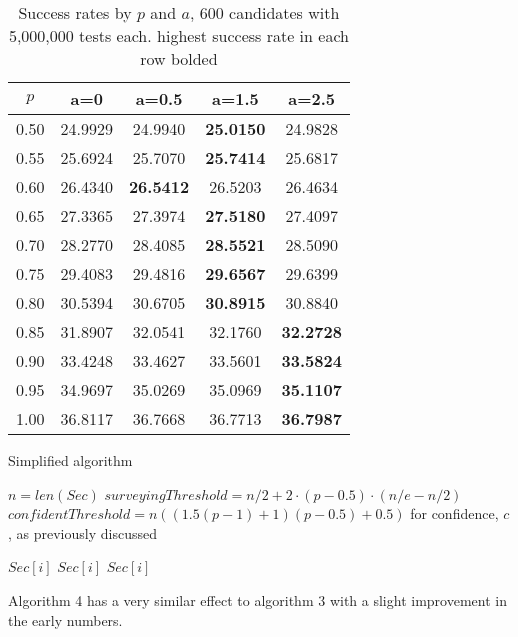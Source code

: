 \documentclass[a4paper,11pt]{article}
\begin{document}
\begin{table}[H]
\centering
\begin{tabular}{c|cccc}
\hline
$p$ & a=0 & a=0.5 & a=1.5 & a=2.5 \\
\hline
0.50 & 24.9929 & 24.9940 & \textbf{25.0150} & 24.9828 \\
0.55 & 25.6924 & 25.7070 & \textbf{25.7414} & 25.6817 \\
0.60 & 26.4340 & \textbf{26.5412} & 26.5203 & 26.4634 \\
0.65 & 27.3365 & 27.3974 & \textbf{27.5180} & 27.4097 \\
0.70 & 28.2770 & 28.4085 & \textbf{28.5521} & 28.5090 \\
0.75 & 29.4083 & 29.4816 & \textbf{29.6567} & 29.6399 \\
0.80 & 30.5394 & 30.6705 & \textbf{30.8915} & 30.8840 \\
0.85 & 31.8907 & 32.0541 & 32.1760 & \textbf{32.2728} \\
0.90 & 33.4248 & 33.4627 & 33.5601 & \textbf{33.5824} \\
0.95 & 34.9697 & 35.0269 & 35.0969 & \textbf{35.1107} \\
1.00 & 36.8117 & 36.7668 & 36.7713 & \textbf{36.7987} \\
\hline
\end{tabular}
\caption{Success rates by $p$ and $a$, 600 candidates with 5,000,000 tests each. highest success rate in each row bolded}
\end{table}

\begin{algorithm}[H]
\caption{Simplified algorithm}
\begin{algorithmic}[1]

\State $n = len(Sec)$
\State $surveyingThreshold = n/2 + 2 \cdot (p-0.5) \cdot (n/e - n/2)$
\State $confidentThreshold = n(\left(1.5\left(p-1\right)+1\right)\left(p-0.5\right)+0.5)$
\State for confidence, $c$, as previously discussed

                \State \Return $Sec[i]$
            \EndIf
            \State \Return $Sec[i]$
        \EndIf
    \EndFor
    \State \Return $Sec[i]$
\EndProcedure
\end{algorithmic}
\end{algorithm}

Algorithm 4 has a very similar effect to algorithm 3 with a slight improvement in the early numbers.
\end{document}
